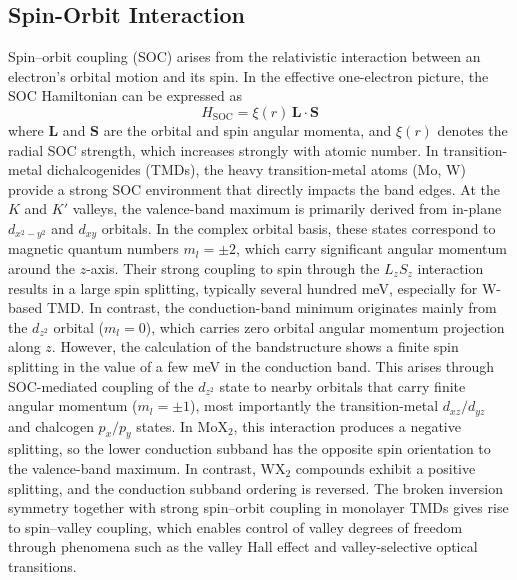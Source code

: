 \subsection{Spin-Orbit Interaction}
Spin--orbit coupling (SOC) arises from the relativistic interaction between an electron’s orbital motion and its spin. 
In the effective one-electron picture, the SOC Hamiltonian can be expressed as
\begin{equation}
H_{\mathrm{SOC}} = \xi(r)\, \mathbf{L}\cdot\mathbf{S}
\label{eq.SOC}
\end{equation}
where $\mathbf{L}$ and $\mathbf{S}$ are the orbital and spin angular momenta, and $\xi(r)$ denotes the radial SOC strength, which increases strongly with atomic number\cite{Sakurai2020-jh,Winkler2003-ty}. 
In transition-metal dichalcogenides (TMDs), the heavy transition-metal atoms (Mo, W) provide a strong SOC environment that directly impacts the band edges\cite{Xiao2012-pw,Liu2013-jh}.
At the $K$ and $K'$ valleys, the valence-band maximum is primarily derived from in-plane $d_{x^2-y^2}$ and $d_{xy}$ orbitals. 
In the complex orbital basis, these states correspond to magnetic quantum numbers $m_l = \pm 2$, which carry significant angular momentum around the $z$-axis. 
Their strong coupling to spin through the $L_z S_z$ interaction results in a large spin splitting, typically several hundred meV, especially for W-based TMD\cite{Kormanyos2015-dn,Zhu-Z-Y-and-Cheng-Y-C-and-Schwingenschl-ogl-U2011-lo}.
In contrast, the conduction-band minimum originates mainly from the $d_{z^2}$ orbital ($m_l = 0$), which carries zero orbital angular momentum projection along $z$. 
However, the calculation of the bandstructure shows a finite spin splitting in the value of a few meV in the conduction band.
This arises through SOC-mediated coupling of the 
$d_{z^2}$ state to nearby orbitals that carry finite angular momentum ($m_l = \pm 1$), most importantly the transition-metal $d_{xz}/d_{yz}$ and chalcogen $p_x/p_y$ states\cite{Liu2013-jh,Kosmider2013-bt}. 
In MoX$_2$, this interaction produces a negative splitting, so the lower conduction subband has the opposite spin orientation to the valence-band maximum. 
In contrast, WX$_2$ compounds exhibit a positive splitting, and the conduction subband ordering is reversed\cite{Liu2013-jh}.
The broken inversion symmetry together with strong spin–orbit coupling in monolayer TMDs gives rise to spin–valley coupling, which enables control of valley degrees of freedom through phenomena such as the valley Hall effect and valley-selective optical transitions\cite{Mak2012-le,Cao2012-tt,Xiao2012-pw}.

